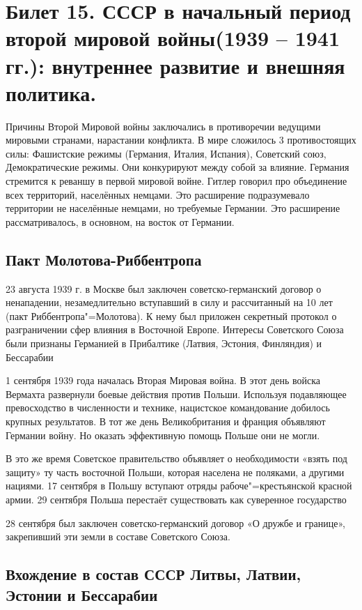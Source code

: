 \section{Билет 15. СССР в начальный период второй мировой войны(1939 – 1941 гг.): внутреннее развитие и внешняя политика.}

Причины Второй Мировой войны заключались в противоречии ведущими мировыми странами, нарастании конфликта. В мире сложилось 3 противостоящих силы: Фашистские режимы (Германия, Италия, Испания), Советский союз, Демократические режимы. Они конкурируют между собой за влияние. Германия стремится к реваншу в первой мировой войне. Гитлер говорил про объединение всех территорий, населённых немцами. Это расширение подразумевало территории не населённые немцами, но требуемые Германии. Это расширение рассматривалось, в основном, на восток от Германии.


\subsection{Пакт Молотова-Риббентропа}

23 августа 1939 г. в Москве был заключен советско-германский договор о ненападении,
незамедлительно вступавший в силу и рассчитанный на 10 лет (пакт Риббентропа"=Молотова). К нему был приложен секретный протокол о разграничении сфер влияния в Восточной Европе. Интересы Советского Союза были признаны Германией в Прибалтике
(Латвия, Эстония, Финляндия) и Бессарабии

1 сентября 1939 года началась Вторая Мировая война. В этот день войска
Вермахта развернули боевые действия против Польши. Используя подавляющее
превосходство в численности и технике, нацистское командование добилось
крупных результатов. В тот же день Великобритания и франция объявляют Германии войну. Но оказать эффективную помощь Польше они не могли.

В это же время Советское правительство объявляет о необходимости «взять под защиту» ту часть восточной Польши, которая населена не поляками, а другими нациями. 17 сентября в Польшу вступают отряды рабоче"=крестьянской красной армии. 29 сентября Польша перестаёт существовать как суверенное государство

28 сентября был заключен советско-германский договор «О дружбе и границе», закрепивший эти земли в составе Советского Союза.

\subsection{Вхождение в состав СССР Литвы, Латвии, Эстонии и Бессарабии}

